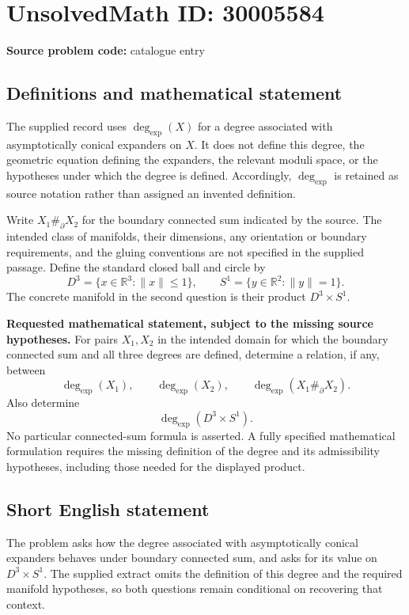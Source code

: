 \documentclass[11pt]{article}
\newcommand{\R}{\mathbb{R}}
\begin{document}
\section*{UnsolvedMath ID: 30005584}
\textbf{Source problem code:} catalogue entry
\subsection{Definitions and mathematical statement}
The supplied record uses \(\deg_{\exp}(X)\) for a degree associated with asymptotically conical expanders on \(X\). It does not define this degree, the geometric equation defining the expanders, the relevant moduli space, or the hypotheses under which the degree is defined. Accordingly, \(\deg_{\exp}\) is retained as source notation rather than assigned an invented definition.

Write \(X_1\#_{\partial}X_2\) for the boundary connected sum indicated by the source. The intended class of manifolds, their dimensions, any orientation or boundary requirements, and the gluing conventions are not specified in the supplied passage. Define the standard closed ball and circle by
\[
D^3=\{x\in\R^3:\|x\|\leq 1\},\qquad
S^1=\{y\in\R^2:\|y\|=1\}.
\]
The concrete manifold in the second question is their product \(D^3\times S^1\).

\textbf{Requested mathematical statement, subject to the missing source hypotheses.} For pairs \(X_1,X_2\) in the intended domain for which the boundary connected sum and all three degrees are defined, determine a relation, if any, between
\[
\deg_{\exp}(X_1),\qquad
\deg_{\exp}(X_2),\qquad
\deg_{\exp}(X_1\#_{\partial}X_2).
\]
Also determine
\[
\deg_{\exp}(D^3\times S^1).
\]
No particular connected-sum formula is asserted. A fully specified mathematical formulation requires the missing definition of the degree and its admissibility hypotheses, including those needed for the displayed product.
\subsection{Short English statement}
The problem asks how the degree associated with asymptotically conical expanders behaves under boundary connected sum, and asks for its value on \(D^3\times S^1\). The supplied extract omits the definition of this degree and the required manifold hypotheses, so both questions remain conditional on recovering that context.
\end{document}
